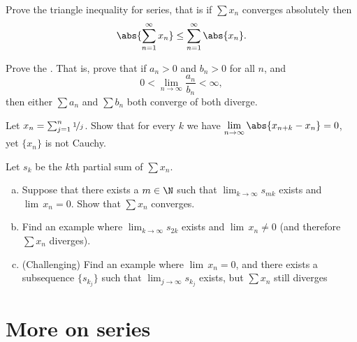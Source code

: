 \documentclass[12pt]{book}
\begin{document}
\begin{exercise}
Prove the triangle inequality for series, that is
if $\sum x_n$ converges absolutely then
\begin{equation*}
\abs{\sum_{n=1}^\infty x_n} \leq
\sum_{n=1}^\infty \abs{x_n} .
\end{equation*}
\end{exercise}

\begin{exercise}
Prove the \emph{}.
That is, prove that if
$a_n > 0$ and $b_n > 0$ for all $n$, and
\begin{equation*}
0 < \lim_{n\to\infty} \frac{a_n}{b_n} < \infty ,
\end{equation*}
then either $\sum a_n$ and $\sum b_n$ both converge of both diverge.
\end{exercise}

\begin{exercise} \label{exercise:badnocauchy}
Let $x_n = \sum_{j=1}^n \nicefrac{1}{j}$.
Show that for every $k$
we have
$\displaystyle \lim_{n\to\infty} \abs{x_{n+k}-x_n} = 0$, yet $\{ x_n \}$ is not Cauchy.
\end{exercise}

\begin{exercise}
Let $s_k$ be the $k$th partial sum of $\sum x_n$.
\begin{enumerate}[a)]
 \item Suppose that there exists a $m \in \N$ such that $\displaystyle \lim_{k\to\infty}
s_{mk}$ exists and $\lim\, x_n = 0$.
Show that $\sum x_n$ converges.
 \item Find an example where $\displaystyle \lim_{k\to\infty} s_{2k}$ exists and
$\lim\, x_n \not= 0$ (and therefore $\sum x_n$ diverges).
 \item (Challenging) Find an example where $\lim\, x_n = 0$, and there exists
a subsequence $\{ s_{k_j} \}$ such that $\displaystyle \lim_{j\to\infty} s_{k_j}$ exists,
but $\sum x_n$ still diverges
\end{enumerate}
\end{exercise}


\sectionnewpage
\section{More on series}
\label{sec:moreonseries}

\end{document}
